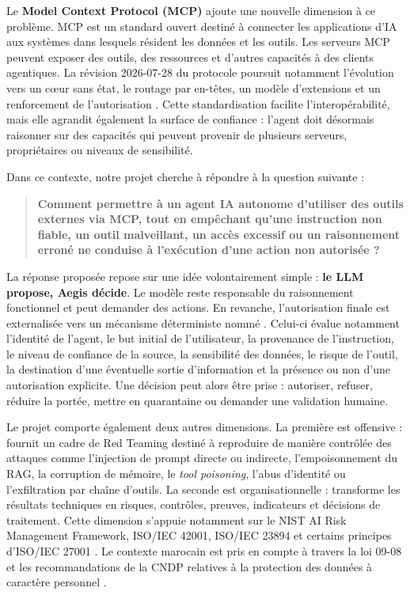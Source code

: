 Le \textbf{Model Context Protocol (MCP)} ajoute une nouvelle dimension à ce problème. MCP est un standard ouvert destiné à connecter les applications d'IA aux systèmes dans lesquels résident les données et les outils. Les serveurs MCP peuvent exposer des outils, des ressources et d'autres capacités à des clients agentiques. La révision 2026-07-28 du protocole poursuit notamment l'évolution vers un cœur sans état, le routage par en-têtes, un modèle d'extensions et un renforcement de l'autorisation \cite{mcp2026}. Cette standardisation facilite l'interopérabilité, mais elle agrandit également la surface de confiance : l'agent doit désormais raisonner sur des capacités qui peuvent provenir de plusieurs serveurs, propriétaires ou niveaux de sensibilité.

Dans ce contexte, notre projet \Aegis{} cherche à répondre à la question suivante :

\begin{quote}
\textbf{Comment permettre à un agent IA autonome d'utiliser des outils externes via MCP, tout en empêchant qu'une instruction non fiable, un outil malveillant, un accès excessif ou un raisonnement erroné ne conduise à l'exécution d'une action non autorisée ?}
\end{quote}

La réponse proposée repose sur une idée volontairement simple : \textbf{le LLM propose, Aegis décide}. Le modèle reste responsable du raisonnement fonctionnel et peut demander des actions. En revanche, l'autorisation finale est externalisée vers un mécanisme déterministe nommé \Guard{}. Celui-ci évalue notamment l'identité de l'agent, le but initial de l'utilisateur, la provenance de l'instruction, le niveau de confiance de la source, la sensibilité des données, le risque de l'outil, la destination d'une éventuelle sortie d'information et la présence ou non d'une autorisation explicite. Une décision peut alors être prise : autoriser, refuser, réduire la portée, mettre en quarantaine ou demander une validation humaine.

Le projet comporte également deux autres dimensions. La première est offensive : \Red{} fournit un cadre de Red Teaming destiné à reproduire de manière contrôlée des attaques comme l'injection de prompt directe ou indirecte, l'empoisonnement du RAG, la corruption de mémoire, le \textit{tool poisoning}, l'abus d'identité ou l'exfiltration par chaîne d'outils. La seconde est organisationnelle : \GRC{} transforme les résultats techniques en risques, contrôles, preuves, indicateurs et décisions de traitement. Cette dimension s'appuie notamment sur le NIST AI Risk Management Framework, ISO/IEC 42001, ISO/IEC 23894 et certains principes d'ISO/IEC 27001 \cite{nistairmf,iso42001,iso23894}. Le contexte marocain est pris en compte à travers la loi 09-08 et les recommandations de la CNDP relatives à la protection des données à caractère personnel \cite{cndp0908,cndpconditions}.

